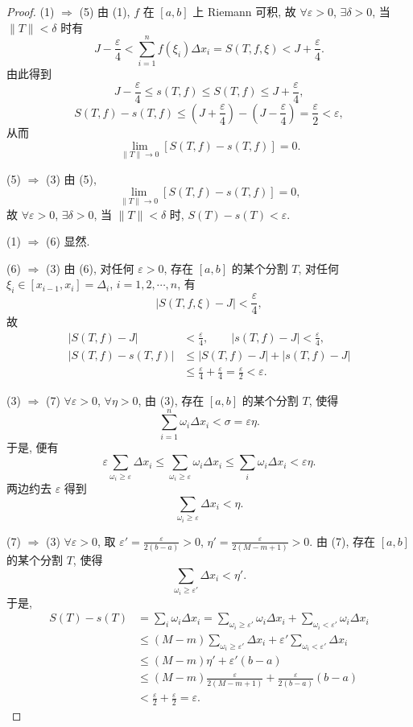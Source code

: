 \begin{proof}
(1) $\Rightarrow$ (5) 由 (1), $f$ 在 $[a,b]$ 上 Riemann 可积, 故 $\forall\varepsilon>0$, $\exists\delta>0$, 当 $\|T\|<\delta$ 时有
\[
J-\frac{\varepsilon}{4}<\sum_{i=1}^{n}f(\xi_{i})\Delta x_{i}=S(T,f,\xi)<J+\frac{\varepsilon}{4}.
\]
由此得到
\[
J-\frac{\varepsilon}{4}\leqslant s(T,f)\leqslant S(T,f)\leqslant J+\frac{\varepsilon}{4},
\]
\[
S(T,f)-s(T,f)\leqslant\left(J+\frac{\varepsilon}{4}\right)-\left(J-\frac{\varepsilon}{4}\right)=\frac{\varepsilon}{2}<\varepsilon,
\]
从而
\[
\lim_{\|T\|\to 0}\left[S(T,f)-s(T,f)\right]=0.
\]

(5) $\Rightarrow$ (3) 由 (5),
\[
\lim_{\|T\|\to 0}\left[S(T,f)-s(T,f)\right]=0,
\]
故 $\forall\varepsilon>0$, $\exists\delta>0$, 当 $\|T\|<\delta$ 时, $S(T)-s(T)<\varepsilon$.

(1) $\Rightarrow$ (6) 显然.

(6) $\Rightarrow$ (3) 由 (6), 对任何 $\varepsilon>0$, 存在 $[a,b]$ 的某个分割 $T$, 对任何 $\xi_{i}\in[x_{i-1},x_{i}]=\Delta_{i}$, $i=1,2,\cdots,n$, 有
\[
|S(T,f,\xi)-J|<\frac{\varepsilon}{4},
\]
故
\begin{align*}
|S(T,f)-J|&<\frac{\varepsilon}{4},\qquad |s(T,f)-J|<\frac{\varepsilon}{4},\\
|S(T,f)-s(T,f)|&\leqslant|S(T,f)-J|+|s(T,f)-J|\\
&\leqslant\frac{\varepsilon}{4}+\frac{\varepsilon}{4}=\frac{\varepsilon}{2}<\varepsilon.
\end{align*}

(3) $\Rightarrow$ (7) $\forall\varepsilon>0$, $\forall\eta>0$, 由 (3), 存在 $[a,b]$ 的某个分割 $T$, 使得
\[
\sum_{i=1}^{n}\omega_{i}\Delta x_{i}<\sigma=\varepsilon\eta.
\]
于是, 便有
\[
\varepsilon\sum_{\omega_{i}\geqslant\varepsilon}\Delta x_{i}\leqslant\sum_{\omega_{i}\geqslant\varepsilon}\omega_{i}\Delta x_{i}\leqslant\sum_{i}\omega_{i}\Delta x_{i}<\varepsilon\eta.
\]
两边约去 $\varepsilon$ 得到
\[
\sum_{\omega_{i}\geqslant\varepsilon}\Delta x_{i}<\eta.
\]

(7) $\Rightarrow$ (3) $\forall\varepsilon>0$, 取 $\varepsilon'=\frac{\varepsilon}{2(b-a)}>0$, $\eta'=\frac{\varepsilon}{2(M-m+1)}>0$. 由 (7), 存在 $[a,b]$ 的某个分割 $T$, 使得
\[
\sum_{\omega_{i}\geqslant\varepsilon'}\Delta x_{i}<\eta'.
\]
于是,
\begin{align*}
S(T)-s(T)&=\sum_{i}\omega_{i}\Delta x_{i}=\sum_{\omega_{i}\geqslant\varepsilon'}\omega_{i}\Delta x_{i}+\sum_{\omega_{i}<\varepsilon'}\omega_{i}\Delta x_{i}\\
&\leqslant(M-m)\sum_{\omega_{i}\geqslant\varepsilon'}\Delta x_{i}+\varepsilon'\sum_{\omega_{i}<\varepsilon'}\Delta x_{i}\\
&\leqslant(M-m)\eta'+\varepsilon'(b-a)\\
&\leqslant(M-m)\frac{\varepsilon}{2(M-m+1)}+\frac{\varepsilon}{2(b-a)}(b-a)\\
&<\frac{\varepsilon}{2}+\frac{\varepsilon}{2}=\varepsilon.
\end{align*}


\end{proof}
